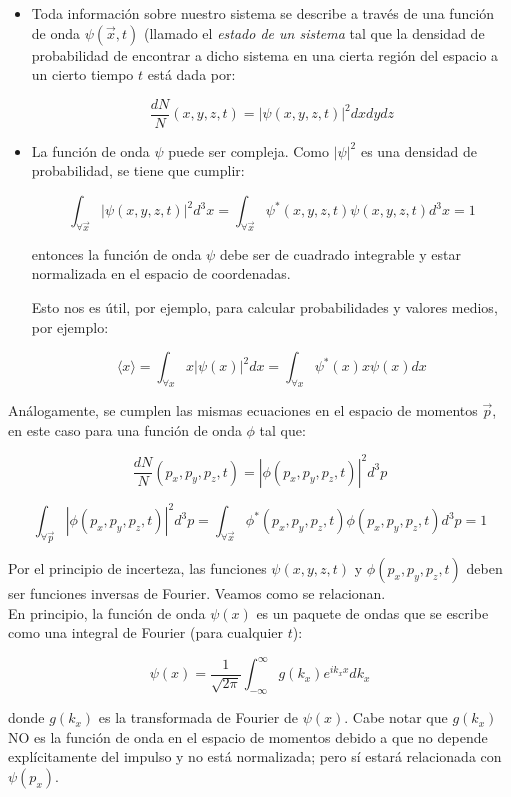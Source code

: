 \documentclass[a4paper]{article}
\begin{document}
\begin{itemize}
\item Toda informaci\'on sobre nuestro sistema se describe a trav\'es de una funci\'on de onda $\psi(\vec{x},t)$ (llamado el \textit{estado de un sistema} tal que la densidad de probabilidad de encontrar a dicho sistema en una cierta regi\'on del espacio a un cierto tiempo $t$ est\'a dada por:

$$\frac{dN}{N}(x,y,z,t) = |\psi(x,y,z,t)|^{2}dxdydz$$
\item La funci\'on de onda $\psi$ puede ser compleja. Como $|\psi|^{2}$ es una densidad de probabilidad, se tiene que cumplir:

$$\int_{\forall \vec{x}} |\psi(x,y,z,t)|^{2}d^{3}x = \int_{\forall \vec{x}} \psi^{*}(x,y,z,t)\psi(x,y,z,t)d^{3}x= 1$$

entonces la funci\'on de onda $\psi$ debe ser de cuadrado integrable y estar normalizada en el espacio de coordenadas.

Esto nos es \'util, por ejemplo, para calcular probabilidades y valores medios, por ejemplo:

$$\langle x \rangle = \int_{\forall x} x|\psi(x)|^{2}dx = \int_{\forall x} \psi^{*}(x)x\psi(x)dx$$
\end{itemize}

An\'alogamente, se cumplen las mismas ecuaciones en el espacio de momentos $\vec{p}$, en este caso para una funci\'on de onda $\phi$ tal que:

$$\frac{dN}{N}(p_{x},p_{y},p_{z},t) = |\phi(p_{x},p_{y},p_{z},t)|^{2}d^{3}p$$

$$\int_{\forall \vec{p}} |\phi(p_{x},p_{y},p_{z},t)|^{2}d^{3}p = \int_{\forall \vec{x}} \phi^{*}(p_{x},p_{y},p_{z},t)\phi(p_{x},p_{y},p_{z},t)d^{3}p= 1$$

Por el principio de incerteza, las funciones $\psi(x,y,z,t)$ y $\phi(p_{x},p_{y},p_{z},t)$ deben ser funciones inversas de Fourier. Veamos como se relacionan.\\

En principio, la funci\'on de onda $\psi(x)$ es un paquete de ondas que se escribe como una integral de Fourier (para cualquier $t$):

\begin{equation}
\label{eq:psifourier}
\psi(x) = \frac{1}{\sqrt{2\pi}}\int_{-\infty}^{\infty} g(k_{x})e^{ik_{x}x}dk_{x}
\end{equation}

donde $g(k_{x})$ es la transformada de Fourier de $\psi(x)$. Cabe notar que $g(k_{x})$ NO es la funci\'on de onda en el espacio de momentos debido a que no depende expl\'icitamente del impulso y no est\'a normalizada; pero s\'i estar\'a relacionada con $\psi(p_{x})$.\\
\end{document}
